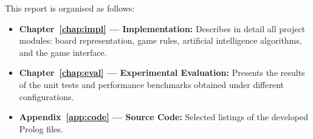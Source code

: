 This report is organised as follows:

\begin{itemize}
  \item \textbf{Chapter~\ref{chap:impl} --- Implementation:}
        Describes in detail all project modules: board representation,
        game rules, artificial intelligence algorithms, and the game
        interface.
  \item \textbf{Chapter~\ref{chap:eval} --- Experimental Evaluation:}
        Presents the results of the unit tests and performance
        benchmarks obtained under different configurations.
  \item \textbf{Appendix~\ref{app:code} --- Source Code:}
        Selected listings of the developed Prolog files.
\end{itemize}
